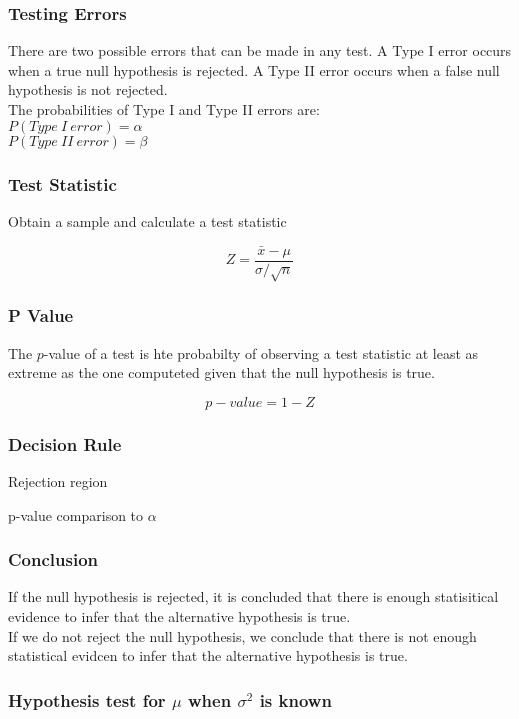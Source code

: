 \documentclass{article}
\begin{document}
\subsubsection{Testing Errors}
There are two possible errors that can be made in any test. A Type I error occurs when a true null hypothesis is rejected.
A Type II error occurs when a false null hypothesis is not rejected.\\

The probabilities of Type I and Type II errors are:\\

$P(Type\:I\:error) = \alpha$\\

$P(Type\:II\:error) = \beta$

\subsubsection{Test Statistic}
Obtain a sample and calculate a test statistic

$$
Z = \frac{\bar{x} - \mu}{\sigma / \sqrt{n}}
$$

\subsubsection{P Value}
The $p$-value of a test is hte probabilty of observing a test statistic at least as extreme as the one computeted given that the null hypothesis is true.

$$
p-value = 1 - Z
$$


\subsubsection{Decision Rule}

Rejection region

p-value comparison to $\alpha$

\subsubsection{Conclusion}
If the null hypothesis is rejected, it is concluded that there is enough statisitical evidence to infer that the alternative hypothesis is true.\\

If we do not reject the null hypothesis, we conclude that there is not enough statistical evidcen to infer that the alternative hypothesis is true.

\subsubsection{Hypothesis test for $\mu$ when $\sigma^2$ is known}
\end{document}
